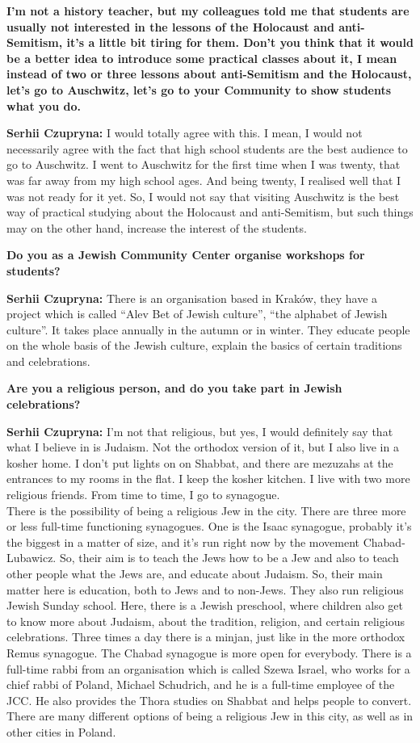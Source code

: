 \textbf{I’m not a history teacher, but my colleagues told me that students are usually not interested in the lessons of the Holocaust and anti-Semitism, it’s a little bit tiring for them. Don’t you think that it would be a better idea to introduce some practical classes about it, I mean instead of two or three lessons about anti-Semitism and the Holocaust, let’s go to Auschwitz, let’s go to your Community to show students what you do.}\par
\textbf{Serhii Czupryna:} I would totally agree with this. I mean, I would not necessarily agree with the fact that high school students are the best audience to go to Auschwitz. I went to Auschwitz for the first time when I was twenty, that was far away from my high school ages. And being twenty, I realised well that I was not ready for it yet. So, I would not say that visiting Auschwitz is the best way of practical studying about the Holocaust and anti-Semitism, but such things may on the other hand, increase the interest of the students.\par  
\textbf{Do you as a Jewish Community Center organise workshops for students?} \par  
\textbf{Serhii Czupryna:} There is an organisation based in Kraków, they have a project which is called “Alev Bet of Jewish culture”, “the alphabet of Jewish culture”. It takes place annually in the autumn or in winter. They educate people on the whole basis of the Jewish culture, explain the basics of certain traditions and celebrations.\par 
\textbf{Are you a religious person, and do you take part in Jewish celebrations?} \par
\textbf{Serhii Czupryna:} I’m not that religious, but yes, I would definitely say that what I believe in is Judaism. Not the orthodox version of it, but I also live in a kosher home. I don’t put lights on on Shabbat, and there are mezuzahs at the entrances to my rooms in the flat. I keep the kosher kitchen. I live with two more religious friends. From time to time, I go to synagogue. \\
There is the possibility of being a religious Jew in the city. There are three more or less full-time functioning synagogues. One is the Isaac synagogue, probably it’s the biggest in a matter of size, and it’s run right now by the movement Chabad-Lubawicz. So, their aim is to teach the Jews how to be a Jew and also to teach other people what the Jews are, and educate about Judaism. So, their main matter here is education, both to Jews and to non-Jews. They also run religious Jewish Sunday school. Here, there is a Jewish preschool, where children also get to know more about Judaism, about the tradition, religion, and certain religious celebrations. Three times a day there is a minjan, just like in the more orthodox Remus synagogue. The Chabad synagogue is more open for everybody. There is a full-time rabbi from an organisation which is called Szewa Israel, who works for a chief rabbi of Poland, Michael Schudrich, and he is a full-time employee of the JCC. He also provides the Thora studies on Shabbat and helps people to convert. There are many different options of being a religious Jew in this city, as well as in other cities in Poland.\par  
